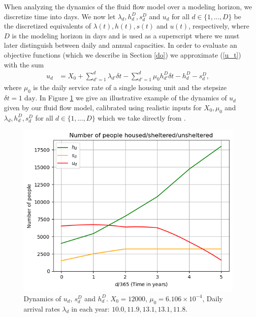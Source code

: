 \documentclass{article}
\begin{document}
When analyzing the dynamics of the fluid flow model over a modeling horizon, we discretize time into days. We now let $\lambda_d, h^D_d, s^D_d$ and $u_d$ for all $d \in \{1,...,D\}$ be the discretized equivalents of $\lambda(t), h(t), s(t)$ and $u(t)$, respectively, where $D$ is the modeling horizon in days and is used as a superscript where we must later distinguish between daily and annual capacities. In order to evaluate an objective functions (which we describe in Section \ref{do}) we approximate (\ref{u_t}) with the sum 
%
\begin{align} \label{u_t_discrete}
u_d & = X_0 + \sum_{d'=1}^{d} \lambda_{d'} \delta t - \sum_{d'=1}^{d} \mu_0 h^D_{d'} \delta t - h^D_d - s^D_d, 
\end{align}
where $\mu_0$ is the daily service rate of a single housing unit and the stepsize $\delta t = 1 \text{ day}$. In Figure \ref{fig:ut-illustrative} we give an illustrative example of the dynamics of $u_d$ given by our fluid flow model, calibrated using realistic inputs for $X_0, \mu_0$ and $\lambda_d, h^D_d, s^D_d$ for all $d \in \{1,...,D\}$ which we take directly from \cite{singham2023discrete}. 

\begin{figure}[h!]%
    \centering
    \includegraphics[scale=0.8]{u_t_example.png}
    \caption{Dynamics of $u_d$, $s^D_d$ and $h^D_d$. $X_0 = 12000$, $\mu_0 = 6.106 \times 10^{-4}$, Daily arrival rates $\lambda_d$ in each year: $10.0,11.9,13.1,13.1,11.8$.}
    \label{fig:ut-illustrative}
\end{figure}
\end{document}
